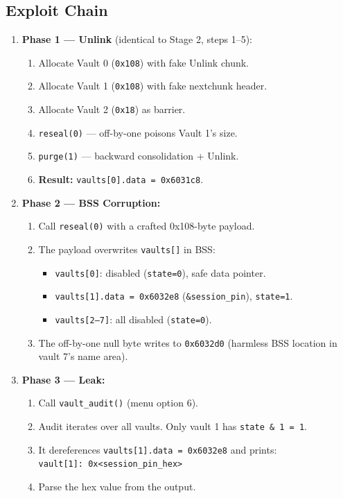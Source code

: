 \documentclass[12pt,a4paper]{article}
\begin{document}
\subsection{Exploit Chain}

\begin{enumerate}
  \item \textbf{Phase 1 — Unlink} (identical to Stage 2, steps 1--5):
  \begin{enumerate}[label=\alph*.]
    \item Allocate Vault 0 (\texttt{0x108}) with fake Unlink chunk.
    \item Allocate Vault 1 (\texttt{0x108}) with fake nextchunk header.
    \item Allocate Vault 2 (\texttt{0x18}) as barrier.
    \item \texttt{reseal(0)} — off-by-one poisons Vault 1's size.
    \item \texttt{purge(1)} — backward consolidation + Unlink.
    \item \textbf{Result:} \texttt{vaults[0].data = 0x6031c8}.
  \end{enumerate}

  \item \textbf{Phase 2 — BSS Corruption:}
  \begin{enumerate}[label=\alph*.]
    \item Call \texttt{reseal(0)} with a crafted 0x108-byte payload.
    \item The payload overwrites \texttt{vaults[]} in BSS:
    \begin{itemize}[nosep]
      \item \texttt{vaults[0]}: disabled (\texttt{state=0}), safe data pointer.
      \item \texttt{vaults[1].data = 0x6032e8} (\texttt{\&session\_pin}),
            \texttt{state=1}.
      \item \texttt{vaults[2--7]}: all disabled (\texttt{state=0}).
    \end{itemize}
    \item The off-by-one null byte writes to \texttt{0x6032d0} (harmless BSS
          location in vault 7's name area).
  \end{enumerate}

  \item \textbf{Phase 3 — Leak:}
  \begin{enumerate}[label=\alph*.]
    \item Call \texttt{vault\_audit()} (menu option 6).
    \item Audit iterates over all vaults. Only vault 1 has \texttt{state \& 1 = 1}.
    \item It dereferences \texttt{vaults[1].data = 0x6032e8} and prints:\\
          \texttt{vault[1]: 0x<session\_pin\_hex>}
    \item Parse the hex value from the output.
  \end{enumerate}


\end{enumerate}
\end{document}
